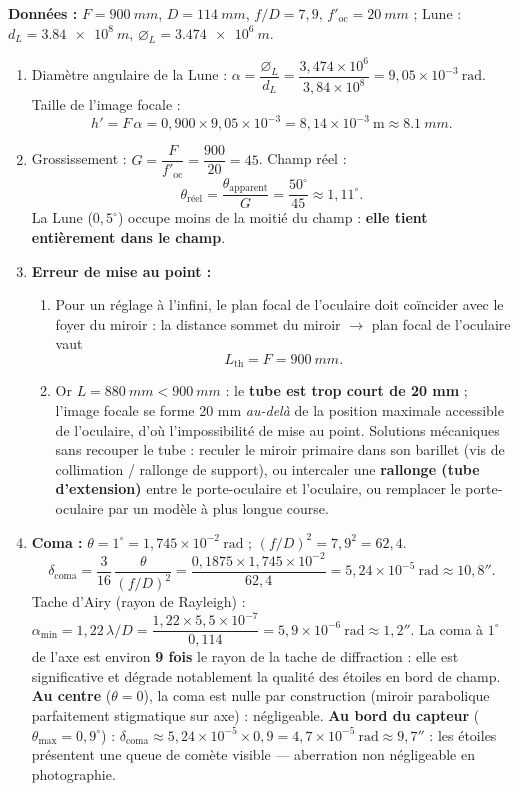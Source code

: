 \documentclass[11pt]{article}
\begin{document}
\begin{corrige}
\textbf{Données :} $F = \SI{900}{mm}$, $D = \SI{114}{mm}$, $f/D = 7,9$, $f'_{\text{oc}} = \SI{20}{mm}$ ; Lune : $d_L = \SI{3,84e8}{m}$, $\varnothing_L = \SI{3,474e6}{m}$.
\begin{enumerate}
    \item Diamètre angulaire de la Lune : $\alpha = \dfrac{\varnothing_L}{d_L} = \dfrac{3,474\times10^{6}}{3,84\times10^{8}} = 9,05\times10^{-3}\ \text{rad}$. Taille de l'image focale :
    \[ h' = F\,\alpha = 0,900 \times 9,05\times10^{-3} = 8,14\times10^{-3}\ \text{m} \approx \SI{8,1}{mm}. \]
    \item Grossissement : $G = \dfrac{F}{f'_{\text{oc}}} = \dfrac{900}{20} = 45$. Champ réel :
    \[ \theta_{\text{réel}} = \frac{\theta_{\text{apparent}}}{G} = \frac{50^\circ}{45} \approx 1,11^\circ. \]
    La Lune ($0,5^\circ$) occupe moins de la moitié du champ : \textbf{elle tient entièrement dans le champ}.
    \item \textbf{Erreur de mise au point :}
        \begin{enumerate}
            \item Pour un réglage à l'infini, le plan focal de l'oculaire doit coïncider avec le foyer du miroir : la distance sommet du miroir $\rightarrow$ plan focal de l'oculaire vaut
            \[ L_{\text{th}} = F = \SI{900}{mm}. \]
            \item Or $L = \SI{880}{mm} < \SI{900}{mm}$ : le \textbf{tube est trop court de 20 mm} ; l'image focale se forme 20 mm \emph{au-delà} de la position maximale accessible de l'oculaire, d'où l'impossibilité de mise au point. Solutions mécaniques sans recouper le tube : reculer le miroir primaire dans son barillet (vis de collimation / rallonge de support), ou intercaler une \textbf{rallonge (tube d'extension)} entre le porte-oculaire et l'oculaire, ou remplacer le porte-oculaire par un modèle à plus longue course.
        \end{enumerate}
    \item \textbf{Coma :} $\theta = 1^\circ = 1,745\times10^{-2}\ \text{rad}$ ; $(f/D)^2 = 7,9^2 = 62,4$.
    \[ \delta_{\text{coma}} = \frac{3}{16}\,\frac{\theta}{(f/D)^2} = \frac{0,1875 \times 1,745\times10^{-2}}{62,4} = 5,24\times10^{-5}\ \text{rad} \approx 10,8''. \]
    Tache d'Airy (rayon de Rayleigh) : $\alpha_{\min} = 1,22\,\lambda/D = \dfrac{1,22 \times 5,5\times10^{-7}}{0,114} = 5,9\times10^{-6}\ \text{rad} \approx 1,2''$.
    La coma à $1^\circ$ de l'axe est environ \textbf{9 fois} le rayon de la tache de diffraction : elle est significative et dégrade notablement la qualité des étoiles en bord de champ. \textbf{Au centre} ($\theta = 0$), la coma est nulle par construction (miroir parabolique parfaitement stigmatique sur axe) : négligeable. \textbf{Au bord du capteur} ($\theta_{\max} = 0,9^\circ$) : $\delta_{\text{coma}} \approx 5,24\times10^{-5} \times 0,9 = 4,7\times10^{-5}\ \text{rad} \approx 9,7''$ : les étoiles présentent une queue de comète visible — aberration non négligeable en photographie.

\end{enumerate}
\end{corrige}
\end{document}
